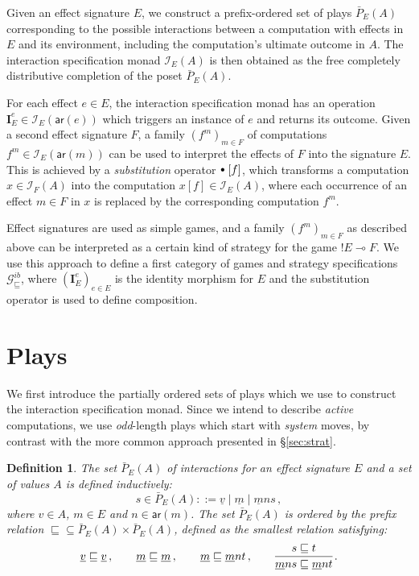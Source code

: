 \documentclass[draft,11pt]{report}
\newtheorem{definition}{Definition}
\newcommand{\gcat}{\mathcal{G}_{\sqsubseteq}}
\newcommand{\kw}[1]{\ensuremath{ \mathsf{#1} }}
\newcommand{\sbt}{\,\begin{picture}(-1,1)(-1,-3)\circle*{3}\end{picture}\ }
\begin{document}
Given an effect signature $E$,
we construct a prefix-ordered set of plays $\bar{P}_E(A)$
corresponding to the possible interactions between
a computation with effects in $E$
and its environment,
including the computation's ultimate outcome in $A$.
The interaction specification monad $\mathcal{I}_E(A)$ is then obtained
as the free completely distributive completion of the poset $\bar{P}_E(A)$.

For each effect $e \in E$,
the interaction specification monad
has an operation
$\mathbf{I}_E^e \in \mathcal{I}_E(\kw{ar}(e))$
which triggers an instance of $e$ and returns its outcome.
Given a second effect signature $F$,
a family $(f^m)_{m \in F}$ of computations
$f^m \in \mathcal{I}_E(\kw{ar}(m))$
can be used to interpret the effects of $F$
into the signature $E$.
This is achieved by a \emph{substitution} operator $\sbt\ [f]$,
which transforms a computation $x \in \mathcal{I}_F(A)$
into the computation $x[f] \in \mathcal{I}_E(A)$,
where each occurrence of an effect $m \in F$ in $x$
is replaced by the corresponding computation $f^m$.

Effect signatures are used as
simple games,
and a family $(f^m)_{m \in F}$ as described above
can be interpreted as
a certain kind of strategy for the game ${!E} \multimap F$.
We use this approach to define
a first category of games and strategy specifications $\gcat^{ib}$,
where $(\mathbf{I}_E^e)_{e \in E}$ is %
the identity morphism for $E$ and
the substitution operator
is used to define composition.


\section{Plays} \label{sec:intm:plays} %

We first introduce the partially ordered sets of plays
which we use to construct the interaction specification monad.
Since we intend to describe \emph{active} computations,
we use \emph{odd}-length plays which start with \emph{system} moves,
by contrast with the more common approach
presented in \S\ref{sec:strat}.

\begin{definition}
The set $\bar{P}_E(A)$ of \emph{interactions}
for an effect signature $E$ and a set of values $A$
is defined inductively:
\[
  s \in \bar{P}_E(A) ::=
    \underline{v} \mid
    \underline{m} \mid
    \underline{m} n s \,,
\]
where $v \in A$, $m \in E$ and $n \in \kw{ar}(m)$.
The set $\bar{P}_E(A)$ is ordered by the prefix relation
${\sqsubseteq} \subseteq \bar{P}_E(A) \times \bar{P}_E(A)$,
defined
as the smallest relation satisfying:
\[
  \underline{v} \sqsubseteq \underline{v} \,, \qquad
  \underline{m} \sqsubseteq \underline{m} \,, \qquad
  \underline{m} \sqsubseteq \underline{m} n t \,, \qquad
  \begin{prooftree}
    \hypo{s \sqsubseteq t}
    \infer1{\underline{m} n s \sqsubseteq \underline{m} n t}
  \end{prooftree} \,.
\]
\end{definition}
\end{document}

